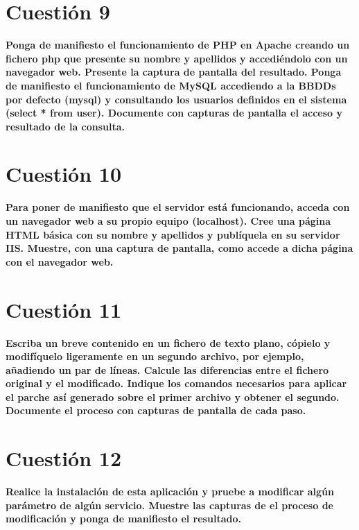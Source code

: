 \documentclass[a4paper,11pt]{article}
\newenvironment{answer}{%
\begin{list}{}{%
}%
\item[]}{\end{list}}
\begin{document}
\section{Cuestión 9}
\textbf{Ponga de manifiesto el funcionamiento de PHP en Apache creando un fichero php que presente su nombre y apellidos 
y accediéndolo con un navegador web. Presente la captura de pantalla del resultado. Ponga de manifiesto el funcionamiento
de MySQL accediendo a la BBDDs por defecto (mysql) y consultando los usuarios definidos en el sistema (select * from user). 
Documente con capturas de pantalla el acceso y resultado de la consulta.}
\begin{answer}
  
\end{answer}

\section{Cuestión 10}
\textbf{Para poner de manifiesto que el servidor está funcionando, acceda con un navegador web a su propio equipo 
(localhost). Cree una página HTML básica con su nombre y apellidos y publíquela en su servidor IIS. Muestre, con una 
captura de pantalla, como accede a dicha página con el navegador web.}
\begin{answer}
  
\end{answer}

\section{Cuestión 11}
\textbf{Escriba un breve contenido en un fichero de texto plano, cópielo y modifíquelo ligeramente en un segundo archivo, 
por ejemplo, añadiendo un par de líneas. Calcule las diferencias entre el fichero original y el modificado. Indique los
comandos necesarios para aplicar el parche así generado sobre el primer archivo y obtener el segundo. Documente el proceso 
con capturas de pantalla de cada paso.}
\begin{answer}
  
\end{answer}

\section{Cuestión 12}
\textbf{Realice la instalación de esta aplicación y pruebe a modificar algún parámetro de algún servicio. Muestre las 
capturas de el proceso de modificación y ponga de manifiesto el resultado.}
\begin{answer}
  
\end{answer}

\printbibliography
\end{document}
